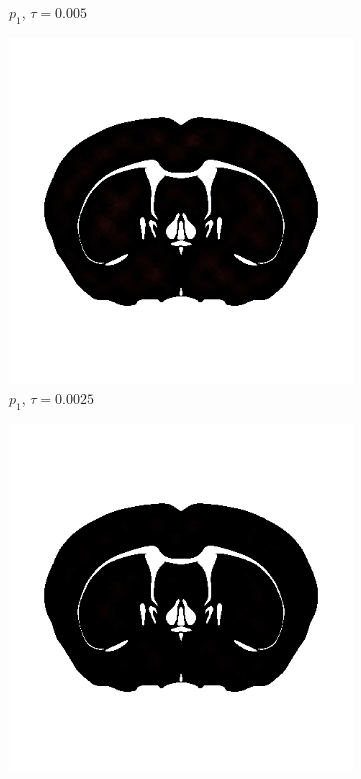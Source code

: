 \begin{figure}[h!]
\begin{subfigure}[b]{0.24\textwidth}
    \caption{$p_1$, $\tau=0.005$}
  \end{subfigure}
  \begin{subfigure}[b]{0.24\textwidth}
    \includegraphics[width=\textwidth,height=\textheight,keepaspectratio,height=\textheight,keepaspectratio]{figures/4_mpet/biomedical/time/eta4_p1_dt3.png}
    \caption{$p_1$, $\tau=0.0025$}
  \end{subfigure}
  \begin{subfigure}[b]{0.24\textwidth}
    \includegraphics[width=\textwidth,height=\textheight,keepaspectratio,height=\textheight,keepaspectratio]{figures/4_mpet/biomedical/time/eta4_p1_dt4.png}

\end{subfigure}
\end{figure}
